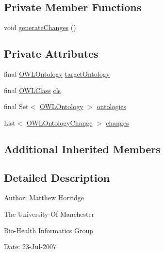 \subsection*{Private Member Functions}
\begin{DoxyCompactItemize}
\item 
void \hyperlink{classorg_1_1semanticweb_1_1owlapi_1_1_convert_super_classes_to_equivalent_class_a4471032422851aefdd4b08aa458bfa8a}{generate\-Changes} ()
\end{DoxyCompactItemize}
\subsection*{Private Attributes}
\begin{DoxyCompactItemize}
\item 
final \hyperlink{interfaceorg_1_1semanticweb_1_1owlapi_1_1model_1_1_o_w_l_ontology}{O\-W\-L\-Ontology} \hyperlink{classorg_1_1semanticweb_1_1owlapi_1_1_convert_super_classes_to_equivalent_class_a2f4bbe3d725d7857c6f52cace2e1ef29}{target\-Ontology}
\item 
final \hyperlink{interfaceorg_1_1semanticweb_1_1owlapi_1_1model_1_1_o_w_l_class}{O\-W\-L\-Class} \hyperlink{classorg_1_1semanticweb_1_1owlapi_1_1_convert_super_classes_to_equivalent_class_a38215d387a59bf28b0f25523b094542d}{cls}
\item 
final Set$<$ \hyperlink{interfaceorg_1_1semanticweb_1_1owlapi_1_1model_1_1_o_w_l_ontology}{O\-W\-L\-Ontology} $>$ \hyperlink{classorg_1_1semanticweb_1_1owlapi_1_1_convert_super_classes_to_equivalent_class_aac704c5553f9affc3fc3711b59794b0a}{ontologies}
\item 
List$<$ \hyperlink{classorg_1_1semanticweb_1_1owlapi_1_1model_1_1_o_w_l_ontology_change}{O\-W\-L\-Ontology\-Change} $>$ \hyperlink{classorg_1_1semanticweb_1_1owlapi_1_1_convert_super_classes_to_equivalent_class_a93ab812fd4585b2d0b0e22a90a59b93d}{changes}
\end{DoxyCompactItemize}
\subsection*{Additional Inherited Members}


\subsection{Detailed Description}
Author\-: Matthew Horridge\par
 The University Of Manchester\par
 Bio-\/\-Health Informatics Group\par
 Date\-: 23-\/\-Jul-\/2007\par
\par
 

